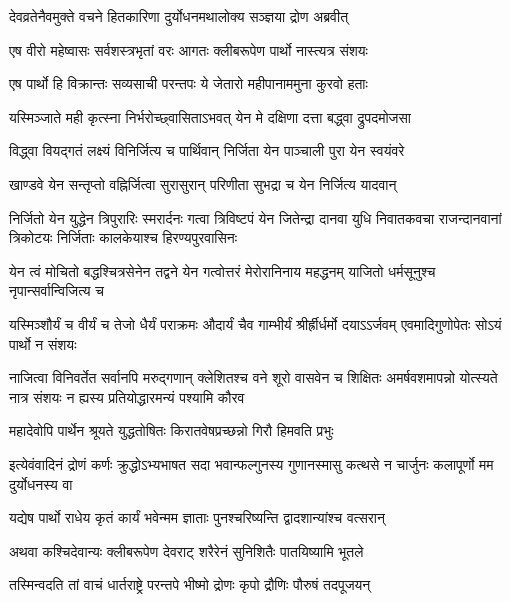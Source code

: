 \twolineshloka
{देवव्रतेनैवमुक्ते वचने हितकारिणा}
{दुर्योधनमथालोक्य सञ्ज्ञया द्रोण अब्रवीत्}


\twolineshloka
{एष वीरो महेष्वासः सर्वशस्त्रभृतां वरः}
{आगतः क्लीबरूपेण पार्थो नास्त्यत्र संशयः}


\twolineshloka
{एष पार्थो हि विक्रान्तः सव्यसाची परन्तपः}
{ये जेतारो महीपानाममुना कुरवो हताः}


\twolineshloka
{यस्मिञ्जाते मही कृत्स्ना निर्भरोच्छ्वासिताऽभवत्}
{येन मे दक्षिणा दत्ता बद्ध्वा द्रुपदमोजसा}


\twolineshloka
{विद्ध्वा वियद्गतं लक्ष्यं विनिर्जित्य च पार्थिवान्}
{निर्जिता येन पाञ्चाली पुरा येन स्वयंवरे}


\twolineshloka
{खाण्डवे येन सन्तृप्तो वह्निर्जित्वा सुरासुरान्}
{परिणीता सुभद्रा च येन निर्जित्य यादवान्}


\onelineshloka
{निर्जितो येन युद्धेन त्रिपुरारिः स्मरार्दनः}
\threelineshloka
{गत्वा त्रिविष्टपं येन जितेन्द्रा दानवा युधि}
{निवातकवचा राजन्दानवानां त्रिकोटयः}
{निर्जिताः कालकेयाश्च हिरण्यपुरवासिनः}


\onelineshloka
{येन त्वं मोचितो बद्धश्चित्रसेनेन तद्वने}
\twolineshloka
{येन गत्वोत्तरं मेरोरानिनाय महद्धनम्}
{याजितो धर्मसूनुश्च नृपान्सर्वान्विजित्य च}


\threelineshloka
{यस्मिञ्शौर्यं च वीर्यं च तेजो धैर्यं पराक्रमः}
{औदार्यं चैव गाम्भीर्यं श्रीर्ह्रीर्धर्मो दयाऽऽर्जवम्}
{एवमादिगुणोपेतः सोऽयं पार्थो न संशयः}


\onelineshloka
{नाजित्वा विनिवर्तेत सर्वानपि मरुद्गणान्}
\threelineshloka
{क्लेशितश्च वने शूरो वासवेन च शिक्षितः}
{अमर्षवशमापन्नो योत्स्यते नात्र संशयः}
{न ह्यस्य प्रतियोद्धारमन्यं पश्यामि कौरव}


\twolineshloka
{महादेवोपि पार्थेन श्रूयते युद्धतोषितः}
{किरातवेषप्रच्छन्नो गिरौ हिमवति प्रभुः}


\onelineshloka
{इत्येवंवादिनं द्रोणं कर्णः क्रुद्धोऽभ्यभाषत}
\twolineshloka
{सदा भवान्फल्गुनस्य गुणानस्मासु कत्थसे}
{न चार्जुनः कलापूर्णो मम दुर्योधनस्य वा}




\twolineshloka
{यद्येष पार्थो राधेय कृतं कार्यं भवेन्मम}
{ज्ञाताः पुनश्चरिष्यन्ति द्वादशान्यांश्च वत्सरान्}


\twolineshloka
{अथवा कश्चिदेवान्यः क्लीबरूपेण देवराट्}
{शरैरेनं सुनिशितैः पातयिष्यामि भूतले}



\twolineshloka
{तस्मिन्वदति तां वाचं धार्तराष्ट्रे परन्तपे}
{भीष्मो द्रोणः कृपो द्रौणिः पौरुषं तदपूजयन्}


